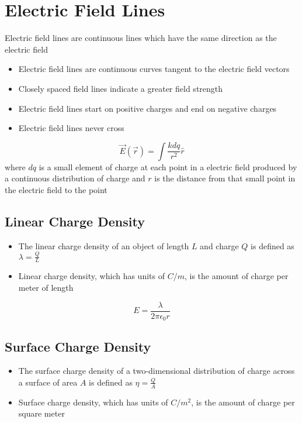\documentclass{article}
\begin{document}
\setlength{\parindent}{0pt}
\setlength{\parskip}{1em}
\section*{Electric Field Lines}
Electric field lines are continuous lines which have the same direction as the electric field

\begin{itemize}
    \item Electric field lines are continuous curves tangent to the electric field vectors
    \item Closely spaced field lines indicate a greater field strength
    \item Electric field lines start on positive charges and end on negative charges
    \item Electric field lines never cross
\end{itemize}

\[\vec{E}(\vec{r})=\int \frac{kdq}{r^2}\hat{r}\]
where $dq$ is a small element of charge at each point in a electric field produced by a continuous
distribution of charge and $r$ is the distance from that small point in the electric field to the
point

\subsection*{Linear Charge Density}
\begin{itemize}
    \item The linear charge density of an object of length $L$ and charge $Q$ is defined as
    $\lambda=\frac{Q}{L}$
    \item Linear charge density, which has units of $C/m$, is the amount of charge per meter of
    length
\end{itemize}

\[E=\frac{\lambda}{2\pi\epsilon_0 r}\]

\subsection*{Surface Charge Density}
\begin{itemize}
    \item The surface charge density of a two-dimensional distribution of charge across a surface
    of area $A$ is defined as $\eta = \frac{Q}{A}$
    \item Surface charge density, which has units of $C/m^2$, is the amount of charge per square
    meter
\end{itemize}
\end{document}
